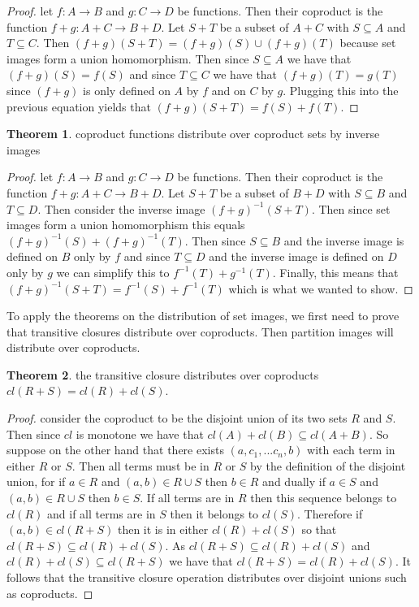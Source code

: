 \documentclass[a4paper,11pt, notitlepage]{report}
\theoremstyle{definition}
\newtheorem{theorem}{Theorem}[section]
\begin{document}
\begin{proof}
let $f: A \to B$ and $g: C \to D$ be functions. Then their coproduct is the function $f + g : A + C \to B + D$. Let $S + T$ be a subset of $A + C$ with $S \subseteq A$ and $T \subseteq C$. Then $(f+g)(S + T) = (f+g)(S) \cup (f+g)(T)$ because set images form a union homomorphism. Then since $S \subseteq A$ we have that $(f+g)(S) = f(S)$ and since $T \subseteq C$ we have that $(f+g)(T) = g(T)$ since $(f+g)$ is only defined on $A$ by $f$ and on $C$ by $g$. Plugging this into the previous equation yields that $(f+g)(S+T) = f(S) + f(T)$.
\end{proof}

\begin{theorem}
coproduct functions distribute over coproduct sets by inverse images
\end{theorem}

\begin{proof}
let $f: A \to B$ and $g: C \to D$ be functions. Then their coproduct is the function $f+g: A + C \to B + D$. Let $S + T$ be a subset of $B+D$ with $S \subseteq B$ and $T \subseteq D$. Then consider the inverse image $(f+g)^{-1}(S + T)$.  Then since set images form a union homomorphism this equals $(f+g)^{-1}(S) + (f+g)^{-1}(T)$.  Then since $S \subseteq B$ and the inverse image is defined on $B$ only by $f$ and since $T \subseteq D$ and the inverse image is defined on $D$ only by $g$ we can simplify this to $f^{-1}(T) + g^{-1}(T)$. Finally, this means that $(f+g)^{-1}(S+T) = f^{-1}(S) + f^{-1}(T)$ which is what we wanted to show.
\end{proof}

To apply the theorems on the distribution of set images, we first need to prove that transitive closures distribute over coproducts. Then partition images will distribute over coproducts.

\begin{theorem}
the transitive closure distributes over coproducts $cl(R+S) = cl(R) + cl(S)$.
\end{theorem}

\begin{proof}
consider the coproduct to be the disjoint union of its two sets $R$ and $S$. Then since $cl$ is monotone we have that $cl(A) + cl(B) \subseteq cl(A+B)$. So suppose on the other hand that there exists $(a,c_1,...c_n,b)$ with each term in either $R$ or $S$. Then all terms must be in $R$ or $S$ by the definition of the disjoint union, for if $a \in R$ and $(a,b) \in R \cup S$ then $b \in R$ and dually if $a \in S$ and $(a,b) \in R \cup S$ then $b \in S$. If all terms are in $R$ then this sequence belongs to $cl(R)$ and if all terms are in $S$ then it belongs to $cl(S)$. Therefore if $(a,b) \in cl(R+S)$ then it is in either $cl(R) + cl(S)$ so that $cl(R + S) \subseteq cl(R) + cl(S)$. As $cl(R+S) \subseteq cl(R) + cl(S)$ and $cl(R) + cl(S) \subseteq cl(R+S)$ we have that $cl(R+S) = cl(R) + cl(S)$. It follows that the transitive closure operation distributes over disjoint unions such as coproducts.
\end{proof}
\end{document}
